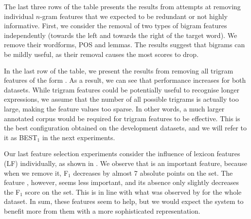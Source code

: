 \documentclass[output=paper,modfonts]{langscibook}
\begin{document}
The last three rows of the table presents the results from attempts at removing individual $n$-gram features that we expected to be redundant or not highly informative.
First, we consider the removal of two types of bigram features independently (towards the left and towards the right of the target word). We remove their wordforms, POS and lemmas. The results suggest that bigrams can be mildly useful, as their removal causes the most scores to drop.

In the last row of the table, we present the results from removing all trigram features of the form . As a result, we can see that performance increases for both datasets. While trigram features could be potentially useful to recognise longer expressions, we assume that the number of all possible trigrams is actually too large, making the feature values too sparse. In other words, a much larger annotated corpus would be required for trigram features to be effective. %
This is the best configuration obtained on the development datasets, and we will refer to it as \textsc{BEST$_1$} in the next experiments.


Our last feature selection experiments consider the influence of lexicon features (\textsc{LF}) individually, as shown in . We observe that  is an important feature, because when we remove it, F$_1$ decreases by almost 7 absolute points on the \devDD{} set. The feature , however, seems less important, and its absence only slightly decreases the F$_1$ score on the \devAQ{} set. This is in line with what was observed by \citet{nasr:acl:2015} for the whole dataset. In sum, these features seem to help, but we would expect the system to benefit more from them with a more sophisticated representation.
\end{document}
